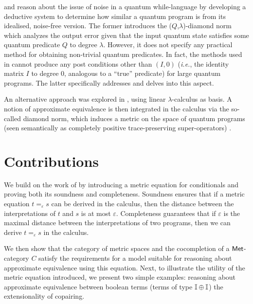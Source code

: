 \cite{hung2019quantitative} and \cite{tao2021gleipnir} reason about the issue of noise in a quantum while-language by developing a deductive system to determine how similar a quantum program is from its idealised, noise-free version. The former introduces the ($Q$,$\lambda$)-diamond norm which analyzes the output error given that the input quantum state satisfies some quantum predicate $Q$ to degree $\lambda$. However, it does not specify any practical method for obtaining non-trivial quantum predicates. In fact, the methods used in \cite{hung2019quantitative} cannot produce any post conditions other than $(I,0)$ (\textit{i.e.}, the identity matrix $I$ to degree 0, analogous to a ``true” predicate) for large quantum programs. The latter specifically addresses and delves into this aspect.  

An alternative approach was explored in \cite{dahlqvist2023syntactic}, using linear $\lambda$-calculus as basis. A notion of approximate equivalence is then
integrated in the calculus via the so-called diamond norm, which induces a metric on the space of quantum programs (seen semantically as completely positive trace-preserving super-operators) \cite{watrous2018theory}. 




\section{Contributions}
We build on the work of \cite{dahlqvist2023syntactic} by introducing a metric equation for conditionals and proving both its soundness and completeness. Soundness ensures that if a metric equation $t =_{\varepsilon} s$ can be derived in the calculus, then the distance between the interpretations of $t$ and $s$ is at most $\varepsilon$. Completeness guarantees that if $\varepsilon$ is the maximal distance between the interpretations of two programs, then we can derive $t =_{\varepsilon} s$ in the calculus. 

We then show that the category of metric spaces and the cocompletion of a $ \mathsf{Met} $-category $ C $ satisfy the requirements for a model suitable for reasoning about approximate equivalence using this equation.  Next, to illustrate the utility of the metric equation introduced, we present two simple examples: reasoning about approximate equivalence between boolean terms (\ie terms of type $ \mathbb{I} \oplus \mathbb{I} $) the extensionality of copairing.


